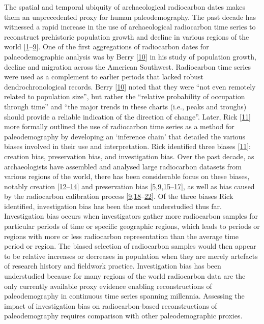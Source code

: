 \documentclass[
]{sa}
\begin{document}
The spatial and temporal ubiquity of archaeological radiocarbon dates makes them an unprecedented proxy for human paleodemography. The past decade has witnessed a rapid increase in the use of archaeological radiocarbon time series to reconstruct prehistoric population growth and decline in various regions of the world {[}\protect\hyperlink{ref-Bevan2019}{1}--\protect\hyperlink{ref-Williams2012}{9}{]}. One of the first aggregations of radiocarbon dates for palaeodemographic analysis was by Berry {[}\protect\hyperlink{ref-Berry1982}{10}{]} in his study of population growth, decline and migration across the American Southwest. Radiocarbon time series were used as a complement to earlier periods that lacked robust dendrochronological records. Berry {[}\protect\hyperlink{ref-Berry1982}{10}{]} noted that they were ``not even remotely related to population size'', but rather the ``relative probability of occupation through time'' and ``the major trends in these charts (i.e., peaks and troughs) should provide a reliable indication of the direction of change''. Later, Rick {[}\protect\hyperlink{ref-Rick1987}{11}{]} more formally outlined the use of radiocarbon time series as a method for paleodemography by developing an `inference chain' that detailed the various biases involved in their use and interpretation. Rick identified three biases {[}\protect\hyperlink{ref-Rick1987}{11}{]}: creation bias, preservation bias, and investigation bias. Over the past decade, as archaeologists have assembled and analysed large radiocarbon datasets from various regions of the world, there has been considerable focus on these biases, notably creation {[}\protect\hyperlink{ref-Crombe2014}{12}--\protect\hyperlink{ref-Naudinot2014}{14}{]} and preservation bias {[}\protect\hyperlink{ref-Peros2010}{5},\protect\hyperlink{ref-Williams2012}{9},\protect\hyperlink{ref-Bluhm2019}{15}--\protect\hyperlink{ref-Surovell2009}{17}{]}, as well as bias caused by the radiocarbon calibration process {[}\protect\hyperlink{ref-Williams2012}{9},\protect\hyperlink{ref-Armit2013}{18}--\protect\hyperlink{ref-Timpson2014}{22}{]}. Of the three biases Rick identified, investigation bias has been the most understudied thus far. Investigation bias occurs when investigators gather more radiocarbon samples for particular periods of time or specific geographic regions, which leads to periods or regions with more or less radiocarbon representation than the average time period or region. The biased selection of radiocarbon samples would then appear to be relative increases or decreases in population when they are merely artefacts of research history and fieldwork practice. Investigation bias has been understudied because for many regions of the world radiocarbon data are the only currently available proxy evidence enabling reconstructions of paleodemography in continuous time series spanning millennia. Assessing the impact of investigation bias on radiocarbon-based reconstructions of paleodemography requires comparison with other paleodemographic proxies.
\end{document}
